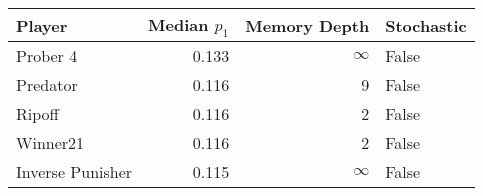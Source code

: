 \begin{tabular}{lrrl}
\toprule
           Player &  Median $p_1$ &  Memory Depth & Stochastic \\
\midrule
         Prober 4 &         0.133 &            \(\infty\) &      False \\
         Predator &         0.116 &             9 &      False \\
           Ripoff &         0.116 &             2 &      False \\
         Winner21 &         0.116 &             2 &      False \\
 Inverse Punisher &         0.115 &            \(\infty\) &      False \\
\bottomrule
\end{tabular}
